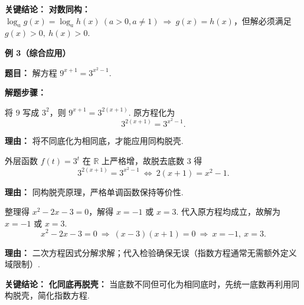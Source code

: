 \begin{examplebox}
	\textbf{\textcolor{CExample}{关键结论：}}
	\textbf{对数同构：} $\log_a g(x)=\log_a h(x)\ (a>0,a\neq1)\ \Rightarrow\ g(x)=h(x)$，但解必须满足 $g(x)>0,\ h(x)>0$.

	\medskip
	\textbf{\textcolor{CExample}{例 3（综合应用）}}

	\textbf{\textcolor{CExample}{题目：}}
	解方程 $9^{x+1}=3^{x^2-1}$.

	\textbf{\textcolor{CExample}{解题步骤：}}
	\begin{description}[style=nextline, leftmargin=2.8em, labelsep=0.5em, itemsep=0.45em]
		\item[\textbf{第一步（统一底数）：}] 将 $9$ 写成 $3^2$，则 $9^{x+1}=3^{2(x+1)}$. 原方程化为
			\[
				3^{2(x+1)}=3^{x^2-1}.
			\]
			\par\textbf{理由：} 将不同底化为相同底，才能应用同构脱壳.
		\item[\textbf{第二步（脱壳转化）：}] 外层函数 $f(t)=3^t$ 在 $\mathbb{R}$ 上严格增，故脱去底数 $3$ 得
			\[
				3^{2(x+1)}=3^{x^2-1}\ \iff\ 2(x+1)=x^2-1.
			\]
			\par\textbf{理由：} 同构脱壳原理，严格单调函数保持等价性.
		\item[\textbf{第三步（解二次方程）：}] 整理得 $x^2-2x-3=0$，解得 $x=-1$ 或 $x=3$. 代入原方程均成立，故解为 $x=-1$ 或 $x=3$.
			\[
				x^2-2x-3=0\ \Rightarrow\ (x-3)(x+1)=0\ \Rightarrow\ x=-1,\ x=3.
			\]
			\par\textbf{理由：} 二次方程因式分解求解；代入检验确保无误（指数方程通常无需额外定义域限制）.
	\end{description}

	\textbf{\textcolor{CExample}{关键结论：}}
	\textbf{化同底再脱壳：} 当底数不同但可化为相同底时，先统一底数再利用同构脱壳，简化指数方程.
\end{examplebox}
